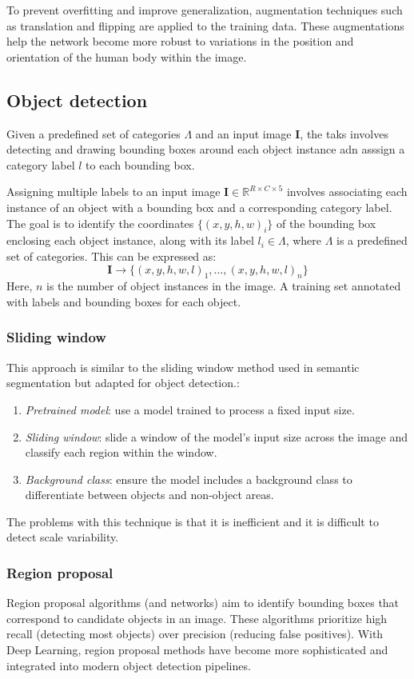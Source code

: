 To prevent overfitting and improve generalization, augmentation techniques such as translation and flipping are applied to the training data. 
These augmentations help the network become more robust to variations in the position and orientation of the human body within the image.

\subsection{Object detection}
Given a predefined set of categories $\Lambda$ and an input image $\mathbf{I}$, the taks involves detecting and drawing bounding boxes around each object instance adn asssign a category label $l$ to each bounding box.

Assigning multiple labels to an input image $\mathbf{I} \in \mathbb{R}^{R \times C \times 5}$ involves associating each instance of an object with a bounding box and a corresponding category label.
The goal is to identify the coordinates $\{(x,y, h, w)_i\}$ of the bounding box enclosing each object instance, along with its label $l_i\in\Lambda$, where $\Lambda$ is a predefined set of categories. 
This can be expressed as:
\[\mathbf{I}\rightarrow \{(x,y,h,w,l)_1,\dots, (x,y,h,w,l)_n\}\]
Here, $n$ is the number of object instances in the image.
A training set annotated with labels and bounding boxes for each object.

\subsubsection{Sliding window}
This approach is similar to the sliding window method used in semantic segmentation but adapted for object detection.: 
\begin{enumerate}
    \item \textit{Pretrained model}: use a model trained to process a fixed input size.
    \item \textit{Sliding window}: slide a window of the model's input size across the image and classify each region within the window.
    \item \textit{Background class}: ensure the model includes a background class to differentiate between objects and non-object areas.
\end{enumerate}
The problems with this technique is that it is inefficient and it is difficult to detect scale variability. 

\subsubsection{Region proposal}
Region proposal algorithms (and networks) aim to identify bounding boxes that correspond to candidate objects in an image. 
These algorithms prioritize high recall (detecting most objects) over precision (reducing false positives).
With Deep Learning, region proposal methods have become more sophisticated and integrated into modern object detection pipelines.

